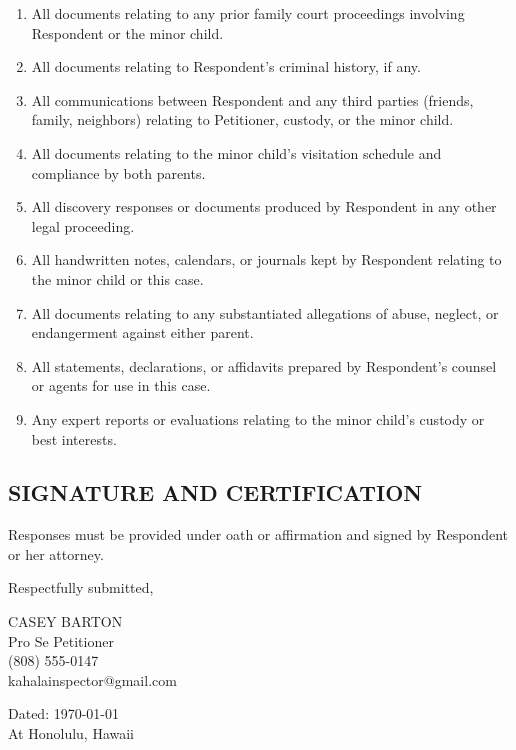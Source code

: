 \documentclass[11pt,letter]{article}
\begin{document}
\begin{enumerate}
\item All documents relating to any prior family court proceedings involving Respondent or the minor child.

\item All documents relating to Respondent's criminal history, if any.

\item All communications between Respondent and any third parties (friends, family, neighbors) relating to Petitioner, custody, or the minor child.

\item All documents relating to the minor child's visitation schedule and compliance by both parents.

\item All discovery responses or documents produced by Respondent in any other legal proceeding.

\item All handwritten notes, calendars, or journals kept by Respondent relating to the minor child or this case.

\item All documents relating to any substantiated allegations of abuse, neglect, or endangerment against either parent.

\item All statements, declarations, or affidavits prepared by Respondent's counsel or agents for use in this case.

\item Any expert reports or evaluations relating to the minor child's custody or best interests.
\end{enumerate}

\subsection*{SIGNATURE AND CERTIFICATION}

Responses must be provided under oath or affirmation and signed by Respondent or her attorney.

\vspace{0.5cm}

Respectfully submitted,

\vspace{1.5cm}

CASEY BARTON \\
Pro Se Petitioner \\
(808) 555-0147 \\
kahalainspector@gmail.com

\vspace{0.5cm}

Dated: \today{} \\
At Honolulu, Hawaii
\end{document}
